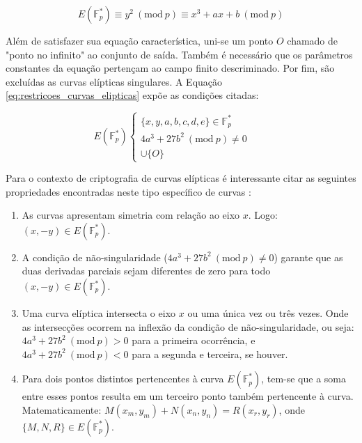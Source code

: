 \documentclass[12pt]{article}
\newcommand{\ModP}[1]{\ (\mathrm{mod}\ #1)}
\begin{document}
            \begin{equation}
            \label{eq:modelo_curva_eliptica}
                E(\mathbb{F}^*_p) \equiv y^2 \ModP p \equiv x^3+ax+b \ModP p
            \end{equation}

            Além de satisfazer sua equação característica, uni-se um ponto $O$ chamado de "ponto no infinito" ao conjunto de saída. Também é necessário que os parâmetros constantes da equação pertençam ao campo finito descriminado. Por fim, são excluídas as curvas elípticas singulares. A Equação \ref{eq:restricoes_curvas_elipticas} expõe as condições citadas:

            \begin{equation}
            \label{eq:restricoes_curvas_elipticas}
                E(\mathbb{F}^*_p)
                \begin{cases}
                    \{x,y,a,b,c,d,e\} \in \mathbb{F}^*_p & \quad \\
                    4a^3+27b^2 \ModP p \ne 0 & \quad \\
                    \cup \{O\}
                \end{cases}
            \end{equation}

            Para o contexto de criptografia de curvas elípticas é interessante citar as seguintes propriedades encontradas neste tipo específico de curvas \cite{laska2012introducao} \cite{portnoi2005curvas}:

            \begin{enumerate}[I]
                \item As curvas apresentam simetria com relação ao eixo $x$. Logo: $(x, -y) \in E(\mathbb{F}^*_p)$.
                \item A condição de não-singularidade ($4a^3+27b^2 \ModP p \ne 0$) garante que as duas derivadas parciais sejam diferentes de zero para todo $(x, -y) \in E(\mathbb{F}^*_p)$.
                \item Uma curva elíptica intersecta o eixo $x$ ou uma única vez ou três vezes. Onde as intersecções ocorrem na inflexão da condição de não-singularidade, ou seja: $4a^3+27b^2 \ModP p > 0$ para a primeira ocorrência, e $4a^3+27b^2 \ModP p < 0$ para a segunda e terceira, se houver.
                \item Para dois pontos distintos pertencentes à curva $E(\mathbb{F}^*_p)$, tem-se que a soma entre esses pontos resulta em um terceiro ponto também pertencente à curva. Matematicamente: $M(x_m, y_m) + N(x_n, y_n) = R(x_r, y_r)$, onde $\{M,N,R\} \in E(\mathbb{F}^*_p)$.
            \end{enumerate}
\end{document}

